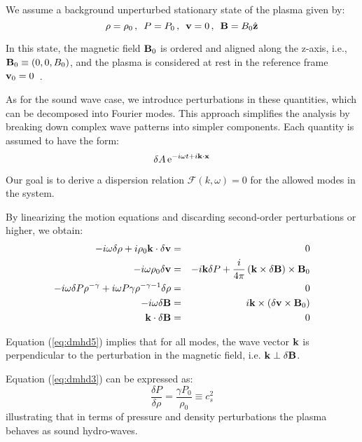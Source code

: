 We assume a background unperturbed stationary state of the plasma given by:
%
\begin{equation}
\rho = \rho_0 \, , \,\,\, P = P_0 \, , \,\,\, \vb{v} = 0 \, , \,\,\, \vb{B} = B_0 \hat{\vb{z}}
\end{equation}

In this state, the magnetic field \(\vb{B}_0\) is ordered and aligned along the z-axis, i.e., \( \vb{B}_0 \equiv (0,0,B_0) \), and the plasma is considered at rest in the reference frame \( \vb{v}_0 = 0 \)~.

As for the sound wave case, we introduce perturbations in these quantities, which can be decomposed into Fourier modes. This approach simplifies the analysis by breaking down complex wave patterns into simpler components. Each quantity is assumed to have the form:
%
\[
\delta A \, {\rm e}^{-i\omega t + i \vb{k} \cdot \vb{x}}
\]

Our goal is to derive a dispersion relation \( \mathcal F (k, \omega) = 0 \) for the allowed modes in the system.

By linearizing the motion equations and discarding second-order perturbations or higher, we obtain:
%
\begin{eqnarray}
-i \omega \delta \rho + i \rho_0 \vb{k} \cdot \delta \vb{v} & = & 0 \label{eq:dmhd1}\\ 
-i \omega \rho_0 \delta \vb{v} & = & - i \vb{k} \delta P + \frac{i}{4\pi} \left(\vb{k} \times \delta \vb{B} \right) \times \vb{B}_0  \label{eq:dmhd2}\\
-i \omega \delta P \rho^{-\gamma} + i\omega P \gamma \rho^{-\gamma-1}\delta \rho & = & 0 \label{eq:dmhd3}\\
-i \omega \delta \vb{B} & = & i \vb{k} \times \left( \delta \vb{v} \times \vb{B}_0  \right) \label{eq:dmhd4}\\ 
\vb{k} \cdot \delta \vb{B} & = & 0  \label{eq:dmhd5}
\end{eqnarray}

Equation (\ref{eq:dmhd5}) implies that for all modes, the wave vector \( \vb{k} \) is perpendicular to the perturbation in the magnetic field, i.e. \( \vb k \perp \delta \vb{B} \).

Equation (\ref{eq:dmhd3}) can be expressed as:
%
\begin{equation}
\frac{\delta P}{\delta \rho}=\frac{\gamma P_0}{\rho_0} \equiv c_s^2
\end{equation}
%
illustrating that in terms of pressure and density perturbations the plasma behaves as sound hydro-waves.

